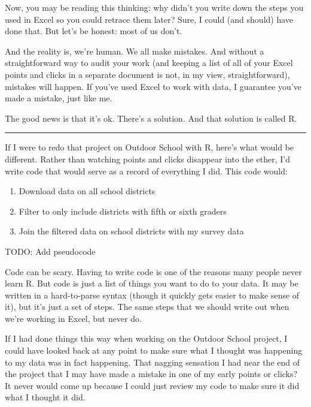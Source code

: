 \documentclass[
]{book}
\providecommand{\tightlist}{%
  \setlength{\itemsep}{0pt}\setlength{\parskip}{0pt}}
\begin{document}
Now, you may be reading this thinking: why didn't you write down the steps you used in Excel so you could retrace them later? Sure, I could (and should) have done that. But let's be honest: most of us don't.

And the reality is, we're human. We all make mistakes. And without a straightforward way to audit your work (and keeping a list of all of your Excel points and clicks in a separate document is not, in my view, straightforward), mistakes will happen. If you've used Excel to work with data, I guarantee you've made a mistake, just like me.

The good news is that it's ok. There's a solution. And that solution is called R.

\begin{center}\rule{0.5\linewidth}{0.5pt}\end{center}

If I were to redo that project on Outdoor School with R, here's what would be different. Rather than watching points and clicks disappear into the ether, I'd write code that would serve as a record of everything I did. This code would:

\begin{enumerate}
\def\labelenumi{\arabic{enumi}.}
\tightlist
\item
  Download data on all school districts
\item
  Filter to only include districts with fifth or sixth graders
\item
  Join the filtered data on school districts with my survey data
\end{enumerate}

TODO: Add pseudocode

Code can be scary. Having to write code is one of the reasons many people never learn R. But code is just a list of things you want to do to your data. It may be written in a hard-to-parse syntax (though it quickly gets easier to make sense of it), but it's just a set of steps. The same steps that we should write out when we're working in Excel, but never do.

If I had done things this way when working on the Outdoor School project, I could have looked back at any point to make sure what I thought was happening to my data was in fact happening. That nagging sensation I had near the end of the project that I may have made a mistake in one of my early points or clicks? It never would come up because I could just review my code to make sure it did what I thought it did.
\end{document}
